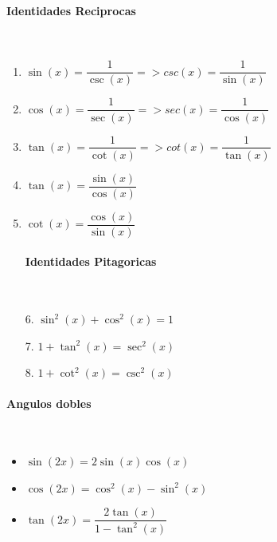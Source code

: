 \documentclass[stu, 12pt, letterpaper, donotrepeattitle, floatsintext, natbib]{apa7}
\begin{document}
    \begin{paracol}{2}
        \paragraph{Identidades Reciprocas}\\
        \begin{enumerate}
            \item $\sin(x) = \dfrac{1}{\csc(x)} => csc(x) = \dfrac{1}{\sin(x)}$
            \item $\cos(x) = \dfrac{1}{\sec(x)} => sec(x) = \dfrac{1}{\cos(x)}$
            \item $\tan(x) = \dfrac{1}{\cot(x)} => cot(x) = \dfrac{1}{\tan(x)}$

            \item $\tan(x) = \dfrac{\sin(x)}{\cos(x)}$
            \item $\cot(x) = \dfrac{\cos(x)}{\sin(x)}$

            \switchcolumn

            \paragraph{Identidades Pitagoricas}\\
            \item[6.] $\sin^2(x) + \cos^2(x) = 1$
            \item[7.] $1 + \tan^2(x) = \sec^2(x)$
            \item[8.] $1 + \cot^2(x) = \csc^2(x)$
        \end{enumerate}
    \end{paracol}

    \paragraph{Angulos dobles}\\
    \begin{itemize}
        \item $\sin(2x) = 2\sin(x)\cos(x)$
        \item $\cos(2x) = \cos^2(x) - \sin^2(x)$
        \item $\tan(2x) = \dfrac{2\tan(x)}{1-\tan^2(x)}$
    \end{itemize}

    \renewcommand\refname{\large\textbf{Referencias}}
%    
    
\end{document}
